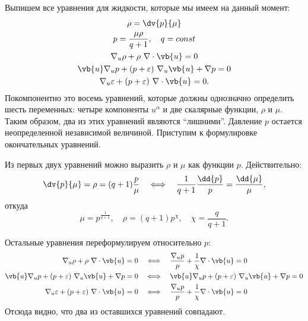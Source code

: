 \documentclass[\docroot/reports/draft/report.tex]{subfiles}
\begin{document}
    Выпишем все уравнения для жидкости, которые мы имеем на данный момент:
    \begin{gather}
        \rho = \dv{p}{\mu} \\
        p = \frac{\mu\rho}{q + 1} , \quad q = const \\
        \nabla_u \rho + \rho\ \nabla \cdot \vb{u} = 0 \\
        \vb{u} \nabla_u p + (p + \varepsilon)\ \nabla_u \vb{u} + \nabla p = 0 \\
        \nabla_u \varepsilon + (p + \varepsilon)\ \nabla \cdot \vb{u} = 0 .
    \end{gather}
    Покомпонентно это восемь уравнений, которые должны однозначно определить шесть переменных: четыре компоненты $u^\alpha$ и две скалярные функции, $\rho$ и $\mu$. Таким образом, два из этих уравнений являются \enquote{лишними}. Давление $p$ остается неопределенной независимой величиной. Приступим к формулировке окончательных уравнений.

    Из первых двух уравнений можно выразить $\rho$ и $\mu$ как функции $p$. Действительно:
    \begin{equation*}
        \dv{p}{\mu} = \rho = (q + 1) \frac{p}{\mu} \quad\Longleftrightarrow\quad
        \frac{1}{q + 1} \frac{\dd{p}}{p} = \frac{\dd{\mu}}{\mu} ,
    \end{equation*}
    откуда
    \begin{equation*}
        \mu = p^{\frac{1}{q + 1}} , \quad \rho = (q + 1) p^{\chi} , \quad \chi = \frac{q}{q + 1} .
    \end{equation*}

    Остальные уравнения переформулируем относительно $p$:
    \begin{align*}
        \nabla_u \rho + \rho\ \nabla \cdot \vb{u} = 0 \quad&\Longleftrightarrow\quad
        \frac{\nabla_u p}{p} + \frac{1}{\chi} \nabla \cdot \vb{u} = 0 \\
        \vb{u} \nabla_u p + (p + \varepsilon)\ \nabla_u \vb{u} + \nabla p = 0 \quad&\Longleftrightarrow\quad
        \vb{u} \nabla_u p + (p + \varepsilon)\ \nabla_u \vb{u} + \nabla p = 0 \\
        \nabla_u \varepsilon + (p + \varepsilon)\ \nabla \cdot \vb{u} = 0 \quad&\Longleftrightarrow\quad
        \frac{\nabla_u p}{p} + \frac{1}{\chi} \nabla \cdot \vb{u} = 0
    \end{align*}
    Отсюда видно, что два из оставшихся уравнений совпадают.
\end{document}
